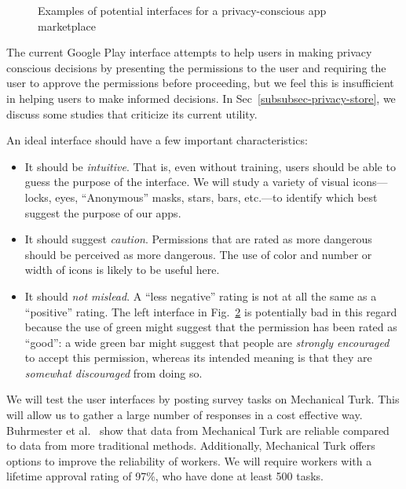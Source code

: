 \documentclass[11pt]{article}
\begin{document}
\begin{figure}
\begin{subfigure}{.5\textwidth}
  \label{locks-perms}
\end{subfigure}
\vspace{1pt}
\caption{Examples of potential interfaces for a privacy-conscious app marketplace}
\label{test-UIs}
\end{figure}

 
The current Google Play interface attempts to help users in making
privacy conscious decisions by presenting the permissions to the user
and requiring the user to approve the permissions before
proceeding, but we feel this is insufficient in helping users to make informed decisions. In Sec~\ref{subsubsec-privacy-store}, we discuss some 
studies that criticize its
current utility.

An ideal interface should have a few important characteristics:
\begin{itemize}

\item
It should be \emph{intuitive}. That is, even without training, users
should be able to guess the purpose of the interface. We will study a
variety of visual icons---locks, eyes, ``Anonymous'' masks, stars,
bars, etc.---to identify which best suggest the purpose of our apps.

\item
It should suggest \emph{caution}. Permissions that are rated as more
dangerous should be perceived as more dangerous. The use of color and
number or width of icons is likely to be useful here.

\item It should \emph{not mislead}. A ``less negative'' rating is not
  at all the same as a ``positive'' rating. The left interface in
  Fig.~\ref{test-UIs} is potentially bad in this regard because the
  use of green might suggest that the permission has been rated as
  ``good'': a wide green bar might suggest that people are
  \emph{strongly encouraged} to accept this permission, whereas its
  intended meaning is that they are \emph{somewhat discouraged} from
  doing so.

\end{itemize}

We will test the user interfaces by posting survey tasks on Mechanical
Turk. This will allow us to gather a large number of responses in a
cost effective way. Buhrmester et al.\ \cite{mturk-data-quality-PPS11} show that data from Mechanical
Turk are reliable compared to data from more traditional
methods. Additionally, Mechanical Turk offers options to improve the
reliability of workers. We will require workers with a lifetime
approval rating of 97\%, who have done at least 500
tasks. 
\end{document}
